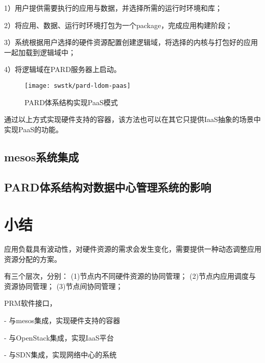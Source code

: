 1）用户提供需要执行的应用与数据，并选择所需的运行时环境和库；

2）将应用、数据、运行时环境打包为一个package，完成应用构建阶段；

3）系统根据用户选择的硬件资源配置创建逻辑域，将选择的内核与打包好的应用一起加载到逻辑域中；

4）将逻辑域在PARD服务器上启动。

\begin{figure}[tb]
  \centering
  \texttt{[image: swstk/pard-ldom-paas]}
  \caption{PARD体系结构实现PaaS模式}
  \label{fig:pard-ldom-paas}
\end{figure}

通过以上方式实现硬件支持的容器，该方法也可以在其它只提供IaaS抽象的场景中实现PaaS的功能。

\subsection{mesos系统集成}



\subsection{PARD体系结构对数据中心管理系统的影响}

\section{小结}


应用负载具有波动性，对硬件资源的需求会发生变化，需要提供一种动态调整应用资源分配的方案。

有三个层次，分别：
(1)节点内不同硬件资源的协同管理；
(2)节点内应用调度与资源协同管理；
(3)节点间协同管理；


PRM软件接口，

- 与mesos集成，实现硬件支持的容器

- 与OpenStack集成，实现IaaS平台

- 与SDN集成，实现网络中心的系统

